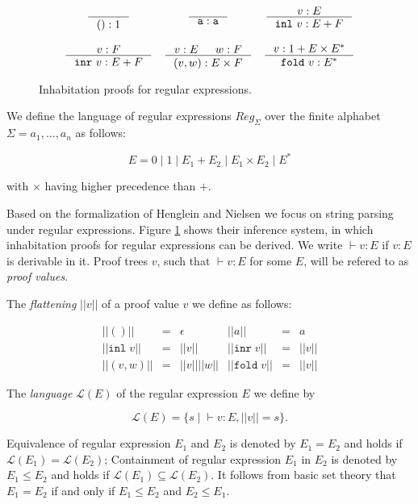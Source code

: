\documentclass[a4paper, oneside]{memoir}
\theoremstyle{definition}
\begin{document}
\begin{figure}
\[
\begin{array}{ccc}
  \inference{}{() : 1}
&
  \inference{}{\texttt{a} : \texttt{a}}
&
  \inference{v : E}{\mathtt{inl}\ v : E + F}
\\
\\
  \inference{v : F}{\mathtt{inr}\ v : E + F}
&
  \inference{v : E & w : F}{(v, w) : E \times F}
&
  \inference{v : 1 + E \times E^{\ast}}{\mathtt{fold}\ v : E^{\ast}}
\end{array}
\]
\caption{Inhabitation proofs for regular expressions.}
\label{fig:inhabitation_proofs}
\end{figure}

We define the language of regular expressions $Reg_\Sigma$ over the finite alphabet $\Sigma = {a_1, \dots, a_n}$ as follows:

\[
    E = 0 \; | \; 1 \; | \; E_1 + E_2 \; | \; E_1 \times E_2 \; | \; E^{*}
\]

\noindent with $\times$ having higher precedence than $+$.

Based on the formalization of Henglein and Nielsen \cite{heni2010} we focus on string parsing under regular expressions. Figure \ref{fig:inhabitation_proofs} shows their inference system, in which inhabitation proofs for regular expressions can be derived. We write $\vdash v : E$ if $v : E$ is derivable in it. Proof trees $v$, such that $\vdash v : E$ for some $E$, will be refered to as \emph{proof values}.

The \emph{flattening} $||v||$ of a proof value $v$ we define as follows:

\[
\begin{array}{rclrcl}
||()|| & = & \epsilon &
||a||  & = & a \\
|| \mathtt{inl} \; v|| & = & ||v|| &
|| \mathtt{inr} \; v|| & = & ||v|| \\
|| (v,w)|| & = & ||v||||w|| &
|| \mathtt{fold} \; v|| & = & ||v||
\end{array}
\]

The \emph{language} $\mathcal{L}(E)$ of the regular expression $E$ we define by

\[
\mathcal{L}(E) = \{ s \; | \; \vdash v : E, ||v|| = s \}.
\]

Equivalence of regular expression $E_1$ and $E_2$ is denoted by $E_1 = E_2$ and holds if $\mathcal{L}(E_1) = \mathcal{L}(E_2)$;
Containment of regular expression $E_1$ in $E_2$ is denoted by $E_1 \le E_2$ and holds if $\mathcal{L}(E_1) \subseteq \mathcal{L}(E_2)$.
It follows from basic set theory that $E_1 = E_2$ if and only if $E_1 \le E_2$ and $E_2 \le E_1$.
\end{document}
